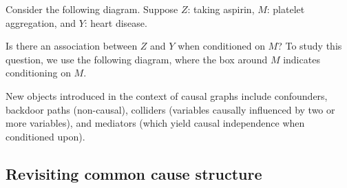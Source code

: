 \begin{example}
    Consider the following diagram. Suppose \( Z \): taking aspirin, \( M \): platelet aggregation, and \( Y \): heart disease.
\begin{center}
\end{center}
Is there an association between \( Z \) and \( Y \) when conditioned on \( M \)? To study this question, we use the following diagram, where the box around $M$ indicates conditioning on $M$.

\begin{center}
\end{center}
\end{example}

New objects introduced in the context of causal graphs include confounders, backdoor paths (non-causal), colliders (variables causally influenced by two or more variables), and mediators (which yield causal independence when conditioned upon).


\subsection{Revisiting common cause structure}

